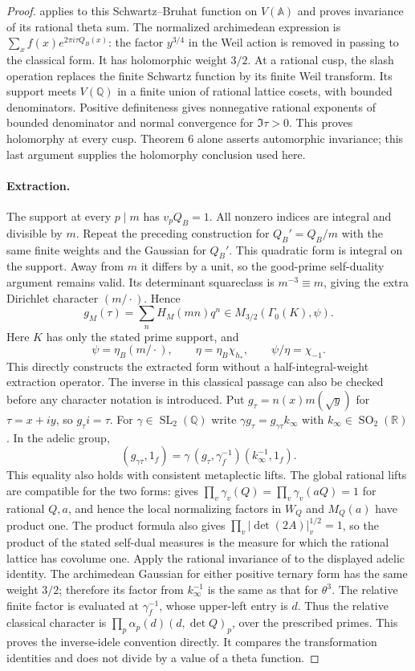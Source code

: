 \documentclass[11pt]{article}
\theoremstyle{definition}
\theoremstyle{remark}
\begin{document}
\begin{proof}
\cite[III, Theorem 6]{weil} applies to this Schwartz--Bruhat function on
$V(\mathbb A)$ and proves invariance of its rational theta sum.
The normalized archimedean expression is
$\sum_x f(x)e^{2\pi i\tau Q_B(x)}$: the factor $y^{3/4}$ in the
Weil action is removed in passing to the classical form.
It has holomorphic weight $3/2$.  At a rational cusp, the slash
operation replaces the finite Schwartz function by its finite
Weil transform.  Its support meets $V(\mathbb Q)$ in a finite
union of rational lattice cosets, with bounded denominators.
Positive definiteness gives nonnegative rational exponents of
bounded denominator and normal convergence for $\Im\tau>0$.
This proves holomorphy at every cusp.  Theorem 6 alone asserts
automorphic invariance; this last argument supplies the
holomorphy conclusion used here.

\paragraph{Extraction.}
The support at every $p\mid m$ has $v_pQ_B=1$.  All nonzero
indices are integral and divisible by $m$.  Repeat the preceding
construction for $Q_B'=Q_B/m$ with the same finite weights and the
Gaussian for $Q_B'$.  This quadratic form is integral on the
support.  Away from $m$ it differs by a unit, so the good-prime
self-duality argument remains valid.  Its determinant squareclass
is $m^{-3}\equiv m$, giving the extra Dirichlet character
$(m/\cdot)$.  Hence
\[
 g_M(\tau)=\sum_n H_M(mn)q^n\in
      M_{3/2}(\Gamma_0(K),\psi).
\]
Here $K$ has only the stated prime support, and
\[
 \psi=\eta_B(m/\cdot),\qquad
 \eta=\eta_B\chi_{h_*},\qquad
 \psi/\eta=\chi_{-1}. \tag{O.5}
\]
This directly constructs the extracted form without a
half-integral-weight extraction operator.
The inverse in this classical passage can also be checked before
any character notation is introduced. Put
$g_\tau=n(x)m(\sqrt y)$ for $\tau=x+iy$, so $g_\tau i=\tau$.
For $\gamma\in\operatorname{SL}_2(\mathbb Q)$ write
$\gamma g_\tau=g_{\gamma\tau}k_\infty$ with
$k_\infty\in\operatorname{SO}_2(\mathbb R)$. In the adelic group,
\[
 (g_{\gamma\tau},1_f)
   =\gamma\,(g_\tau,\gamma_f^{-1})(k_\infty^{-1},1_f).
\]
This equality also holds with consistent metaplectic lifts.
The global rational lifts are compatible for the two forms:
\cite[II.30, Proposition~5]{weil} gives
$\prod_v\gamma_v(Q)=\prod_v\gamma_v(aQ)=1$ for rational $Q,a$,
and hence the local normalizing factors in $W_Q$ and $M_Q(a)$
have product one. The product formula also gives
$\prod_v|\det(2A)|_v^{1/2}=1$, so the product of the stated
self-dual measures is the measure for which the rational lattice
has covolume one. Apply the rational invariance of
\cite[III.41, Theorem~6]{weil} to the displayed adelic identity.
The archimedean Gaussian for either positive ternary form has
the same weight $3/2$; therefore its factor from $k_\infty^{-1}$
is the same as that for $\theta^3$. The relative finite factor
is evaluated at $\gamma_f^{-1}$, whose upper-left entry is $d$.
Thus the relative classical character is
$\prod_p\alpha_p(d)(d,\det Q)_p$, over the prescribed primes.
This proves the inverse-idele convention directly. It compares
the transformation identities and does not divide by a value
of a theta function.


\end{proof}
\end{document}
